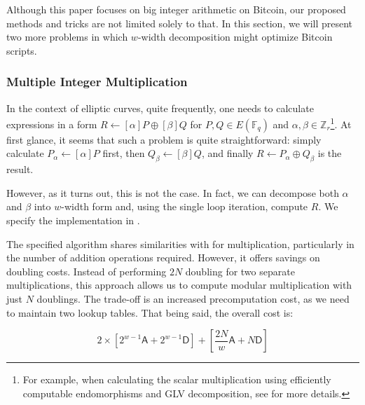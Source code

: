 \documentclass{iacrtrans}
\begin{document}
Although this paper focuses on big integer arithmetic on Bitcoin, our proposed methods and tricks are not limited solely to that. In this section, we will present two more problems in which $w$-width decomposition might optimize Bitcoin scripts.

\subsubsection{Multiple Integer Multiplication}

In the context of elliptic curves, quite frequently, one needs to calculate expressions in a form $R \gets [\alpha]P\oplus [\beta]Q$ for $P,Q \in E(\mathbb{F}_q)$ and $\alpha,\beta \in \mathbb{Z}_r$\footnote{For example, when calculating the scalar multiplication using efficiently computable endomorphisms and GLV decomposition, see \cite{guide_ec} for more details.}. At first glance, it seems that such a problem is quite straightforward: simply calculate $P_{\alpha} \gets [\alpha]P$ first, then $Q_{\beta} \gets [\beta]Q$, and finally $R \gets P_{\alpha}\oplus Q_{\beta}$ is the result. 

However, as it turns out, this is not the case. In fact, we can decompose both $\alpha$ and $\beta$ into $w$-width form and, using the single loop iteration, compute $R$. We specify the implementation in .

The specified algorithm shares similarities with  for multiplication, particularly in the number of addition operations required. However, it offers savings on doubling costs. Instead of performing $2N$ doubling for two separate multiplications, this approach allows us to compute modular multiplication with just $N$ doublings. The trade-off is an increased precomputation cost, as we need to maintain two lookup tables. That being said, the overall cost is:

\begin{equation}
    2\times\left[2^{w-1}\mathsf{A} + 2^{w-1}\mathsf{D}\right] + \left[\frac{2N}{w} \mathsf{A} + N \mathsf{D}\right]
\end{equation}
\end{document}
